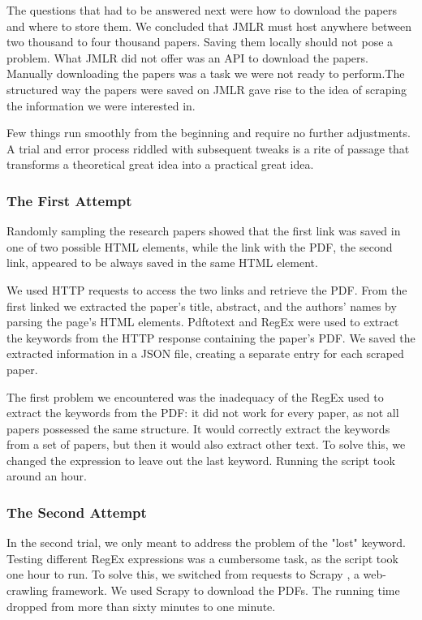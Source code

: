 The questions that had to be answered next were how to download the papers and where to store them. We concluded that JMLR \cite{jmlr} must host anywhere between two thousand to four thousand papers. Saving them locally should not pose a problem. What JMLR \cite{jmlr} did not offer was an API to download the papers. Manually downloading the papers was a task we were not ready to perform.The structured way the papers were saved on JMLR \cite{jmlr}  gave rise to the idea of scraping the information we were interested in. 


Few things run smoothly from the beginning and require no further adjustments. A trial and error process riddled with subsequent tweaks is a rite of passage that transforms a theoretical great idea into a practical great idea.
\subsubsection{The First Attempt}
\subsubcomment{}
Randomly sampling the research papers showed that the first link was saved in one of two possible HTML elements, while the link with the PDF, the second link, appeared to be always saved in the same HTML element.


We used HTTP requests to access the two links and retrieve the PDF. From the first linked we extracted the paper's title, abstract, and the authors' names by parsing the page's HTML elements. Pdftotext \cite{p2t} and RegEx were used to extract the keywords from the HTTP response containing the paper's PDF. We saved the extracted information in a JSON file, creating a separate entry for each scraped paper.


The first problem we encountered was the inadequacy of the RegEx used to extract the keywords from the PDF: it did not work for every paper, as not all papers possessed the same structure. It would correctly extract the keywords from a set of papers, but then it would also extract other text. To solve this, we changed the expression to leave out the last keyword. Running the script took around an hour. 

\subsubsection{The Second Attempt} 
\subsubcomment{}
In the second trial, we only meant to address the problem of the "lost" keyword. Testing different RegEx expressions was a cumbersome task, as the script took one hour to run. To solve this, we switched from requests to Scrapy \cite{kouzis2016learning}, a web-crawling framework. We used Scrapy \cite{kouzis2016learning} to download the PDFs. The running time dropped from more than sixty minutes to one minute. 


